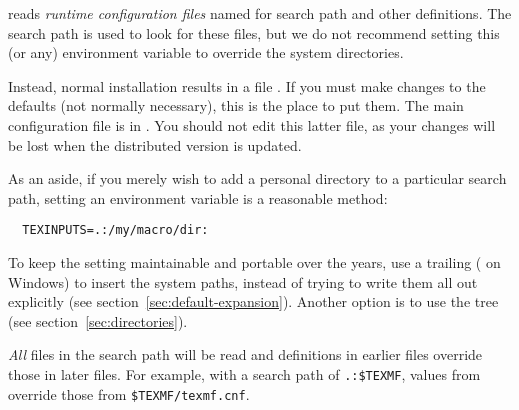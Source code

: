 \documentclass{article}
\begin{document}
\KPS{} reads \emph{runtime configuration files} named 
for search path and other definitions.  The search path
 is used to look for these files, but we do not
recommend setting this (or any) environment variable to override the
system directories.

Instead, normal installation results in a file
.  If you must make changes to the defaults
(not normally necessary), this is the place to put them.  The main
configuration file is in .
You should not edit this latter file, as your changes will be lost when
the distributed version is updated.

As an aside, if you merely wish to add a personal directory to a
particular search path, setting an environment variable is a reasonable
method:
\begin{verbatim}
  TEXINPUTS=.:/my/macro/dir:
\end{verbatim}
To keep the setting maintainable and portable over the years, use a
trailing \samp{:} (\samp{;} on Windows) to insert the system paths,
instead of trying to write them all out explicitly (see
section~\ref{sec:default-expansion}). Another option is to use the
 tree (see section~\ref{sec:directories}).

\emph{All}  files in the search path will be read and
definitions in earlier files override those in later files.  For
example, with a search path of \verb|.:$TEXMF|, values from
 override those from \verb|$TEXMF/texmf.cnf|.
\end{document}
